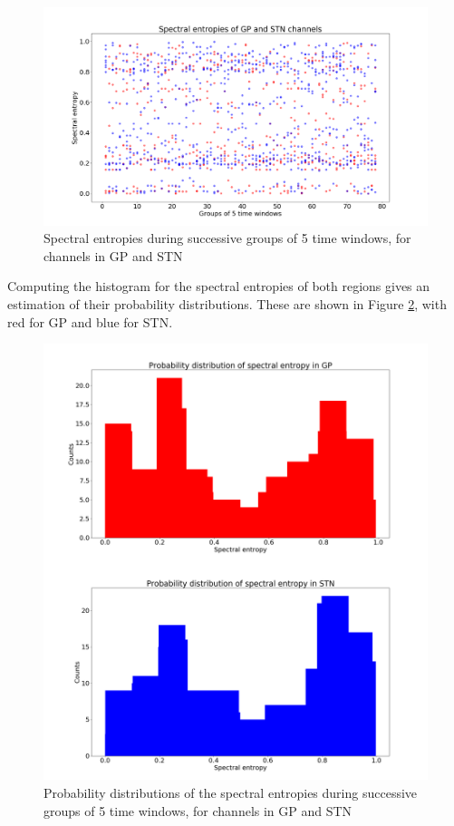 \documentclass{kththesis}
\begin{document}
\begin{figure}[H]
    \centering
    \centerline{\includegraphics[width=1\textwidth]{images/spiking/spec_entr_5tw.png}}
    \caption{Spectral entropies during successive groups of 5 time windows, for channels in GP and STN}
    \label{fig:SE1}
\end{figure}

Computing the histogram for the spectral entropies of both regions gives an estimation of their probability distributions. These are shown in Figure \ref{fig:SE2}, with red for GP and blue for STN.

\begin{figure}[H]
    \centering
    \centerline{\includegraphics[width=1\textwidth]{images/spiking/hist_se.png}}
    \caption{Probability distributions of the spectral entropies during successive groups of 5 time windows, for channels in GP and STN}
    \label{fig:SE2}
\end{figure}
\end{document}

